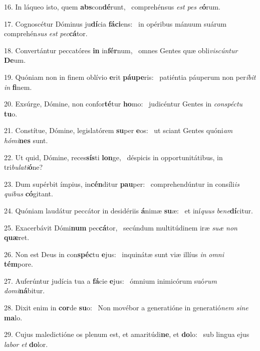 16. In láqueo isto, quem \textbf{abs}con\textbf{dé}runt, \ast\  comprehénsus \textit{est} \textit{pes} \textit{e}\textbf{ó}rum.\

17. Cognoscétur Dóminus ju\textbf{dí}cia \textbf{fá}\textbf{ci}ens: \ast\  in opéribus mánuum suárum comprehén\textit{sus} \textit{est} \textit{pec}\textbf{cá}tor.\

18. Convertántur peccatóres \textbf{in} in\textbf{fér}num, \ast\  omnes Gentes quæ obli\textit{vis}\textit{cún}\textit{tur} \textbf{De}um.\

19. Quóniam non in finem oblívio \textbf{e}rit \textbf{páu}\textbf{pe}ris: \ast\  patiéntia páuperum non per\textit{í}\textit{bit} \textit{in} \textbf{fi}nem.\

20. Exsúrge, Dómine, non confor\textbf{té}tur \textbf{ho}mo: \ast\  judicéntur Gentes in \textit{con}\textit{spéc}\textit{tu} \textbf{tu}o.\

21. Constítue, Dómine, legislatórem \textbf{su}per \textbf{e}os: \ast\  ut sciant Gentes quóni\textit{am} \textit{hó}\textit{mi}\textbf{nes} sunt.\

22. Ut quid, Dómine, reces\textbf{sís}ti \textbf{lon}ge, \ast\  déspicis in opportunitátibus, in tri\textit{bu}\textit{la}\textit{ti}\textbf{ó}ne?\

23. Dum supérbit ímpius, in\textbf{cén}ditur \textbf{pau}per: \ast\  comprehendúntur in consíli\textit{is} \textit{qui}\textit{bus} \textbf{có}gitant.\

24. Quóniam laudátur peccátor in desidériis \textbf{á}nimæ \textbf{su}æ: \ast\  et iní\textit{quus} \textit{be}\textit{ne}\textbf{dí}citur.\

25. Exacerbávit Dómi\textbf{num} pec\textbf{cá}tor, \ast\  secúndum multitúdinem iræ \textit{su}\textit{æ} \textit{non} \textbf{quæ}ret.\

26. Non est Deus in con\textbf{spéc}tu \textbf{e}jus: \ast\  inquinátæ sunt viæ illíus \textit{in} \textit{om}\textit{ni} \textbf{tém}pore.\

27. Auferúntur judícia tua a \textbf{fá}cie \textbf{e}jus: \ast\  ómnium inimicórum suó\textit{rum} \textit{do}\textit{mi}\textbf{ná}bitur.\

28. Dixit enim in \textbf{cor}de \textbf{su}o: \ast\  Non movébor a generatióne in generatió\textit{nem} \textit{si}\textit{ne} \textbf{ma}lo.\

29. Cujus maledictióne os plenum est, et amaritúdi\textbf{ne}, et \textbf{do}lo: \ast\  sub lingua ejus \textit{la}\textit{bor} \textit{et} \textbf{do}lor.\

